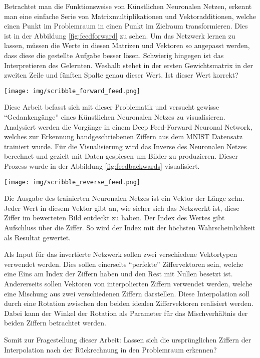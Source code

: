 \documentclass[Interploate_hadwritten_Digits.tex]{subfiles}
\begin{document}
	Betrachtet man die Funktionsweise von Künstlichen Neuronalen Netzen, erkennt man eine einfache Serie von Matrixmultiplikationen und Vektoradditionen, welche einen Punkt im Problemraum in einen Punkt im Zielraum transformieren. Dies ist in der Abbildung \ref{fig:feedforward} zu sehen. Um das Netzwerk lernen zu lassen, müssen die Werte in diesen Matrizen und Vektoren so angepasst werden, dass diese die gestellte Aufgabe besser lösen. Schwierig hingegen ist das Interpretieren des Gelernten. Weshalb stehet in der ersten Gewichtsmatrix in der zweiten Zeile und fünften Spalte genau dieser Wert. Ist dieser Wert korrekt?
	\begin{Figure}
		\centering
		\texttt{[image: img/scribble\_forward\_feed.png]}
		\label{fig:feedforward}
	\end{Figure}
	Diese Arbeit befasst sich mit dieser Problematik und versucht gewisse ``Gedankengänge'' eines Künstlichen Neuronalen Netzes zu visualisieren. Analysiert werden die Vorgänge in einem Deep Feed-Forward Neuronal Network, welches zur Erkennung handgeschriebenen Ziffern aus dem MNIST Datensatz trainiert wurde. Für die Visualisierung wird das Inverse des Neuronalen Netzes berechnet und gezielt mit Daten gespiesen um Bilder zu produzieren. Dieser Prozess wurde in der Abbildung \ref{fig:feedbackwards} visualisiert.
	\begin{Figure}
		\centering
		\texttt{[image: img/scribble\_reverse\_feed.png]}
		\captionof{figure}{Intertierung des Neuronalen Neztes}
		\label{fig:feedbackwards}
	\end{Figure}
	Die Ausgabe des trainierten Neuronalen Netzes ist ein Vektor der Länge zehn. Jeder Wert in diesem Vektor gibt an, wie sicher sich das Netzwerkt ist, diese Ziffer im bewerteten Bild entdeckt zu haben. Der Index des Wertes gibt Aufschluss über die Ziffer. So wird der Index mit der höchsten Wahrscheinlichkeit als Resultat gewertet.
	
	Als Input für das invertierte Netzwerk sollen zwei verschiedene Vektortypen verwendet werden. Dies sollen einerseits ``perfekte'' Ziffervektoren sein, welche eine Eins am Index der Ziffern haben und den Rest mit Nullen besetzt ist. Andererseits sollen Vektoren von interpolierten Ziffern verwendet werden, welche eine Mischung aus zwei verschiedenen Ziffern darstellen. Diese Interpolation soll durch eine Rotation zwischen den beiden idealen Ziffervektoren realisiert werden. Dabei kann der Winkel der Rotation als Parameter für das Mischverhältnis der beiden Ziffern betrachtet werden.
	
	Somit zur Fragestellung dieser Arbeit: Lassen sich die ursprünglichen Ziffern der Interpolation nach der Rückrechnung in den Problemraum erkennen?
\end{document}
